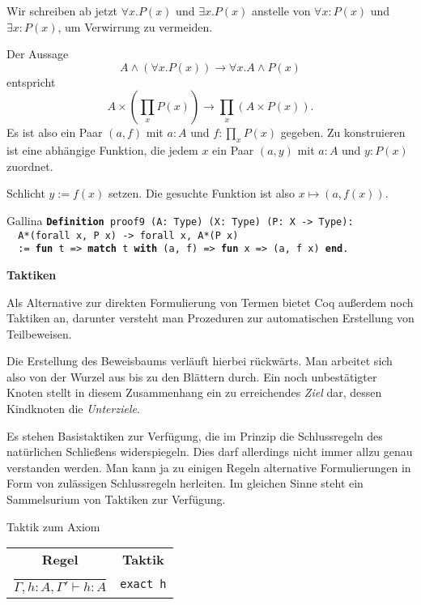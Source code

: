 \documentclass[8pt]{beamer}
\newcommand{\strong}[1]{\textsf{\textbf{#1}}}
\newcommand{\centerheadline}[1]{%
  \begin{center}\strong{#1}\end{center}}
\newcommand{\parspace}{\vspace{0.8em}}
\newcommand{\cond}{\rightarrow}
\newcommand{\kw}[1]{\textbf{#1}}
\begin{document}
\begin{frame}
Wir schreiben ab jetzt $\forall x.P(x)$ und $\exists x.P(x)$ anstelle
von $\forall x\colon P(x)$ und $\exists x\colon P(x)$, um Verwirrung
zu vermeiden.

\parspace
Der Aussage
\[A\land(\forall x. P(x))\cond\forall x.A\land P(x)\]
entspricht
\[A\times(\prod_x P(x))\to\prod_x (A\times P(x)).\]
Es ist also ein Paar $(a,f)$ mit $a\colon A$ und $f\colon\prod_x P(x)$
gegeben. Zu konstruieren ist eine abhängige Funktion, die jedem
$x$ ein Paar $(a,y)$ mit $a\colon A$ und $y\colon P(x)$ zuordnet.\pause

\parspace
Schlicht $y:=f(x)$ setzen. Die gesuchte Funktion ist also $x\mapsto (a,f(x))$.
\begin{block}{Gallina}
\texttt{\kw{Definition} proof9 (A: Type) (X: Type) (P: X -> Type):\\
\ \ A*(forall x, P x) -> forall x, A*(P x)\\
\ \ := \kw{fun} t => \kw{match} t \kw{with} (a, f) => \kw{fun} x => (a, f x) \kw{end}.}
\end{block}
\end{frame}

\begin{frame}
\centerheadline{Taktiken}
\end{frame}

\begin{frame}
Als Alternative zur direkten Formulierung von Termen bietet Coq
außerdem noch Taktiken an, darunter versteht man Prozeduren zur
automatischen Erstellung von Teilbeweisen.\pause

\parspace
Die Erstellung des Beweisbaums verläuft hierbei rückwärts.
Man arbeitet sich also von der Wurzel aus bis zu den Blättern durch.
Ein noch unbestätigter Knoten stellt in diesem Zusammenhang ein zu
erreichendes \emph{Ziel} dar, dessen Kindknoten die \emph{Unterziele}.

\parspace
Es stehen Basistaktiken zur Verfügung, die im Prinzip die Schlussregeln
des natürlichen Schließens widerspiegeln. Dies darf allerdings nicht
immer allzu genau verstanden werden. Man kann ja zu einigen Regeln
alternative Formulierungen in Form von zulässigen Schlussregeln herleiten.
Im gleichen Sinne steht ein Sammelsurium von Taktiken zur Verfügung.
\end{frame}

\begin{frame}
\begin{block}{Taktik zum Axiom}
\begin{center}
\begin{tabular}{c@{\qquad\quad}c}
\strong{Regel} & \strong{Taktik}\\[6pt]
$\dfrac{}{\Gamma, h\colon A, \Gamma'\vdash h\colon A}$
& \texttt{exact h}
\end{tabular}
\end{center}
\end{block}
\end{frame}
\end{document}
